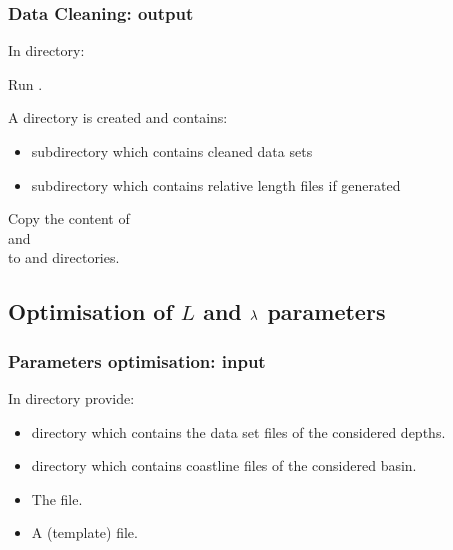 
\begin{frame}
\frametitle{Data Cleaning: output}

\centerline{In  directory:}
\vspace{0.5cm}

{Run }.


A  directory is created and contains:
\begin{itemize}
\item {} subdirectory which contains cleaned data sets
\item {} subdirectory which contains relative length files if generated
\end{itemize}

\Large{
\begin{center}
Copy the content of\\ 
 and  \\
to  and  directories.
\end{center}
}


\end{frame}

\subsection{Optimisation of $L$ and $\lambda$ parameters}

\begin{frame}
\frametitle{Parameters optimisation: input}

\centerline{In  directory provide:}
\begin{itemize}
\item {} directory which contains the data set files of the considered depths.
\item {} directory which contains coastline  files of the considered basin.
\item The  file.
\item A (template)  file.
\end{itemize}

\end{frame}

